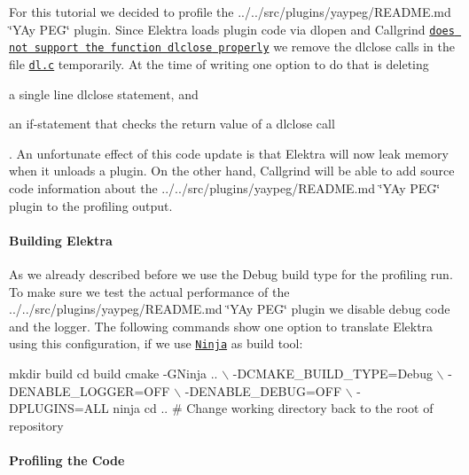 For this tutorial we decided to profile the ../../src/plugins/yaypeg/\+R\+E\+A\+D\+ME.md \char`\"{}\+Y\+Ay P\+E\+G\char`\"{} plugin. Since Elektra loads plugin code via {\ttfamily dlopen} and Callgrind \href{https://stackoverflow.com/questions/16719395}{\tt does not support the function {\ttfamily dlclose} properly} we remove the {\ttfamily dlclose} calls in the file \href{/home/markus/Projekte/Elektra/current/src/libs/loader/dl.c}{\tt {\ttfamily dl.\+c}} temporarily. At the time of writing one option to do that is deleting


\begin{DoxyItemize}
\item a single line {\ttfamily dlclose} statement, and
\item an {\ttfamily if}-\/statement that checks the return value of a {\ttfamily dlclose} call
\end{DoxyItemize}

. An unfortunate effect of this code update is that Elektra will now leak memory when it unloads a plugin. On the other hand, Callgrind will be able to add source code information about the ../../src/plugins/yaypeg/\+R\+E\+A\+D\+ME.md \char`\"{}\+Y\+Ay P\+E\+G\char`\"{} plugin to the profiling output.

\paragraph*{Building Elektra}

As we already described before we use the {\ttfamily Debug} build type for the profiling run. To make sure we test the actual performance of the ../../src/plugins/yaypeg/\+R\+E\+A\+D\+ME.md \char`\"{}\+Y\+Ay P\+E\+G\char`\"{} plugin we disable debug code and the logger. The following commands show one option to translate Elektra using this configuration, if we use \href{https://ninja-build.org}{\tt Ninja} as build tool\+:


\begin{DoxyCode}
mkdir build
cd build
cmake -GNinja ..               \(\backslash\)
      -DCMAKE\_BUILD\_TYPE=Debug \(\backslash\)
      -DENABLE\_LOGGER=OFF      \(\backslash\)
      -DENABLE\_DEBUG=OFF       \(\backslash\)
      -DPLUGINS=ALL
ninja
cd .. # Change working directory back to the root of repository
\end{DoxyCode}


\paragraph*{Profiling the Code}

